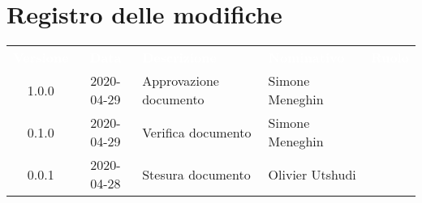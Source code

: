 \section*{Registro delle modifiche}
{
	\centering
	\begin{longtable}{ c c C{4cm}  C{4cm}  C{3cm} }
		\textcolor{white}{\textbf{Versione}} & \textcolor{white}{\textbf{Data}} & \textcolor{white}{\textbf{Descrizione}} & \textcolor{white}{\textbf{Nominativo}} & \textcolor{white}{\textbf{Ruolo}}\\		
		1.0.0 & 2020-04-29 & Approvazione documento & Simone Meneghin &\RdP{}\\		
		0.1.0 & 2020-04-29 & Verifica documento & Simone Meneghin &\ver{}\\		
		0.0.1 & 2020-04-28 & Stesura documento & Olivier Utshudi &\reda{}\\		
		
	\end{longtable}

}